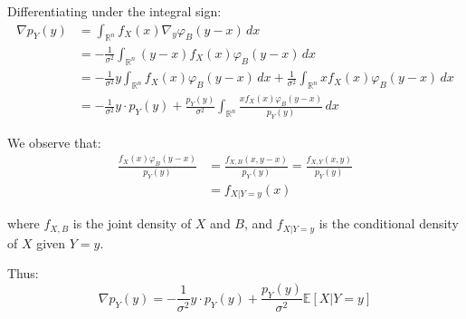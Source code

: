 \documentclass[a4paper,10pt]{article}
\begin{document}
Differentiating under the integral sign:
\begin{align*}
\nabla p_Y(y) &= \int_{\mathbb{R}^n} f_X(x) \nabla_y \varphi_B(y - x) \, dx \\
&= -\frac{1}{\sigma^2} \int_{\mathbb{R}^n} (y - x) f_X(x) \varphi_B(y - x) \, dx \\
&= -\frac{1}{\sigma^2} y \int_{\mathbb{R}^n} f_X(x) \varphi_B(y - x) \, dx + \frac{1}{\sigma^2} \int_{\mathbb{R}^n} x f_X(x) \varphi_B(y - x) \, dx \\
&= -\frac{1}{\sigma^2} y \cdot p_Y(y) + \frac{p_Y(y)}{\sigma^2} \int_{\mathbb{R}^n} \frac{x f_X(x) \varphi_B(y - x)}{p_Y(y)} \, dx
\end{align*}

We observe that:
\begin{align*}
\frac{f_X(x) \varphi_B(y - x)}{p_Y(y)} &= \frac{f_{X,B}(x, y - x)}{p_Y(y)} = \frac{f_{X,Y}(x, y)}{p_Y(y)} \\
&= f_{X|Y=y}(x)
\end{align*}

where $f_{X,B}$ is the joint density of $X$ and $B$, and $f_{X|Y=y}$ is the conditional density of $X$ given $Y = y$.

Thus:
\begin{equation*}
\nabla p_Y(y) = -\frac{1}{\sigma^2} y \cdot p_Y(y) + \frac{p_Y(y)}{\sigma^2} \mathbb{E}[X | Y = y]
\end{equation*}
\end{document}
